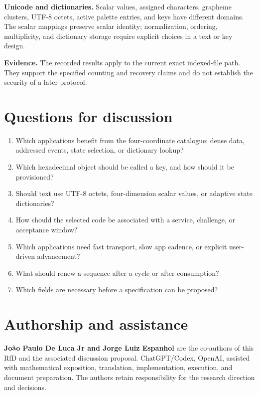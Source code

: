 \documentclass[
  11pt,
  a4paper,
]{article}
\providecommand{\tightlist}{%
  \setlength{\itemsep}{0pt}\setlength{\parskip}{0pt}}
\begin{document}
\textbf{Unicode and dictionaries.} Scalar values, assigned characters,
grapheme clusters, UTF-8 octets, active palette entries, and keys have
different domains. The scalar mappings preserve scalar identity;
normalization, ordering, multiplicity, and dictionary storage require
explicit choices in a text or key design.

\textbf{Evidence.} The recorded results apply to the current exact
indexed-file path. They support the specified counting and recovery
claims and do not establish the security of a later protocol.

\hypertarget{questions-for-discussion}{%
\section{Questions for discussion}\label{questions-for-discussion}}

\begin{enumerate}
\def\labelenumi{\arabic{enumi}.}
\tightlist
\item
  Which applications benefit from the four-coordinate catalogue: dense
  data, addressed events, state selection, or dictionary lookup?
\item
  Which hexadecimal object should be called a key, and how should it be
  provisioned?
\item
  Should text use UTF-8 octets, four-dimension scalar values, or
  adaptive state dictionaries?
\item
  How should the selected code be associated with a service, challenge,
  or acceptance window?
\item
  Which applications need fast transport, slow app cadence, or explicit
  user-driven advancement?
\item
  What should renew a sequence after a cycle or after consumption?
\item
  Which fields are necessary before a specification can be proposed?
\end{enumerate}

\hypertarget{authorship-and-assistance}{%
\section{Authorship and assistance}\label{authorship-and-assistance}}

\textbf{João Paulo De Luca Jr and Jorge Luiz Espanhol} are the
co-authors of this RfD and the associated discussion proposal.
ChatGPT/Codex, OpenAI, assisted with mathematical exposition,
translation, implementation, execution, and document preparation. The
authors retain responsibility for the research direction and decisions.
\end{document}
